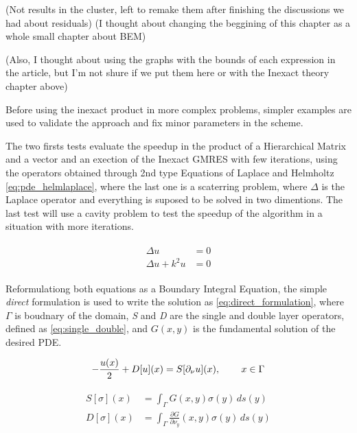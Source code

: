 
(Not results in the cluster, left to remake them after finishing the discussions we had about residuals)
(I thought about changing the beggining of this chapter as a whole small chapter about BEM)

(Also, I thought about using the graphs with the bounds of each expression in the article, but I'm not shure if we put them here or with the Inexact theory chapter above)

Before using the inexact product in more complex problems, simpler examples are used to validate the approach and fix minor parameters in the scheme.

The two firsts tests evaluate the speedup in the product of a Hierarchical Matrix and a vector and an exection of the Inexact GMRES with few iterations, using the operators obtained through 2nd type Equations of Laplace and Helmholtz \ref{eq:pde_helmlaplace}, where the last one is a scaterring problem, where $\Delta$ is the Laplace operator and everything is suposed to be solved in two dimentions. The last test will use a cavity problem to test the speedup of the algorithm in a situation with more iterations.

\begin{align}\label{eq:pde_helmlaplace}
    \begin{split}
        \Delta u &= 0 \\
        \Delta u + k^{2}u &= 0
    \end{split}
\end{align}

Reformulationg both equations as a Boundary Integral Equation, the simple \textit{direct} formulation is used to write the solution as \ref{eq:direct_formulation}, where $\Gamma$ is boudnary of the domain, \textit{S} and \textit{D} are the single and double layer operators, defined as \ref{eq:single_double}, and $G(x,y)$ is the fundamental solution of the desired PDE.

\begin{equation}\label{eq:direct_formulation}
    -\frac{u(x)}{2} + D[u](x) = S[\partial_{\nu }u] (x), \hspace{0.3in} x \in \Gamma
\end{equation}

\begin{align}\label{eq:single_double}
    \begin{split}
        S[\sigma](x) &= \int_{\Gamma} G(x,y) \sigma(y)  \,ds(y) \\
        D[\sigma](x) &= \int_{\Gamma} \frac{\partial G}{\partial \nu_{y}}(x,y) \sigma(y)  \,ds(y)
    \end{split}
\end{align}

